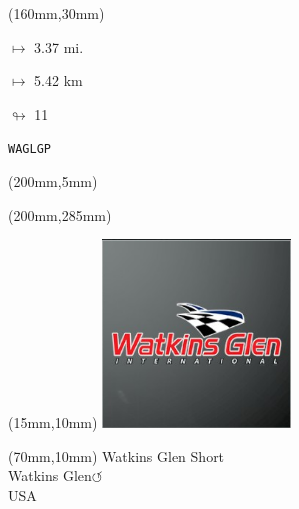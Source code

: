 \begin{textblock*}{40mm}(160mm,30mm)%
\Large
\par$\mapsto$ 3.37 mi.
\par$\mapsto$ 5.42 km
\par$\looparrowright$ 11
\par\hfill\tiny\tt WAGLGP\\
\end{textblock*}
\begin{textblock*}{20mm}(200mm,5mm)%
\fbox{\thepage}
\label{WAGLGP}
\end{textblock*}
\begin{textblock*}{20mm}(200mm,285mm)%
\fbox{\thepage}
\end{textblock*}

\null\newpage
\begin{textblock*}{50mm}(15mm,10mm)%
\includegraphics[width=50mm]{LG/2015-05-20_00097.png}
\end{textblock*}
\begin{textblock*}{130mm}(70mm,10mm)%
{\fontsize{20}{20}\selectfont Watkins Glen Short\\}
{\fontsize{16}{16}\selectfont Watkins Glen\hfill \huge$\circlearrowleft$\\}
{\fontsize{12}{12}\selectfont USA\\}
\end{textblock*}
